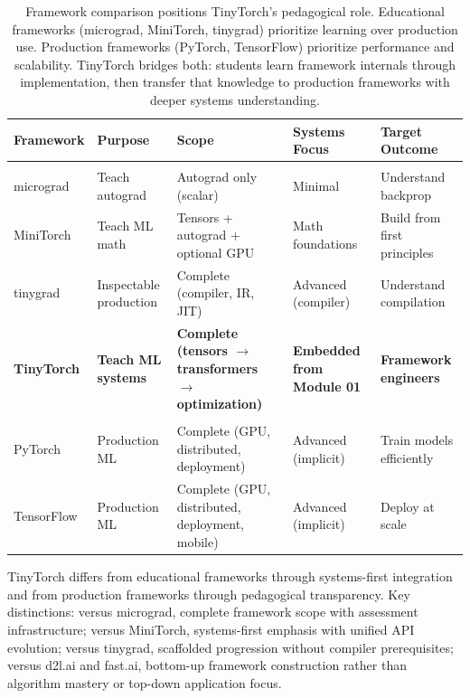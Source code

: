 \documentclass[10pt,twocolumn]{article}
\begin{document}
\begin{table}[tp]
\centering
\caption{Framework comparison positions TinyTorch's pedagogical role. Educational frameworks (micrograd, MiniTorch, tinygrad) prioritize learning over production use. Production frameworks (PyTorch, TensorFlow) prioritize performance and scalability. TinyTorch bridges both: students learn framework internals through implementation, then transfer that knowledge to production frameworks with deeper systems understanding.}
\label{tab:framework-comparison}
\small
\renewcommand{\arraystretch}{1.4}
\setlength{\tabcolsep}{6pt}
\begin{tabularx}{0.98\textwidth}{@{}>{\raggedright\arraybackslash}p{2.0cm}>{\raggedright\arraybackslash}p{2.0cm}>{\raggedright\arraybackslash}X>{\raggedright\arraybackslash}X>{\raggedright\arraybackslash}X@{}}
\toprule
\textbf{Framework} & \textbf{Purpose} & \textbf{Scope} & \textbf{Systems Focus} & \textbf{Target Outcome} \\
\midrule
\multicolumn{5}{@{}l}{\textbf{Educational Frameworks}} \\
\addlinespace[2pt]
micrograd & Teach autograd & Autograd only (scalar) & Minimal & Understand backprop \\
MiniTorch & Teach ML math & Tensors + autograd + optional GPU & Math foundations & Build from first principles \\
tinygrad & Inspectable production & Complete (compiler, IR, JIT) & Advanced (compiler) & Understand compilation \\
\addlinespace[1pt]
\textbf{TinyTorch} & \textbf{Teach ML systems} & \textbf{Complete (tensors $\rightarrow$ transformers $\rightarrow$ optimization)} & \textbf{Embedded from Module 01} & \textbf{Framework engineers} \\
\addlinespace[2pt]
\midrule
\multicolumn{5}{@{}l}{\textbf{Production Frameworks}} \\
\addlinespace[2pt]
PyTorch & Production ML & Complete (GPU, distributed, deployment) & Advanced (implicit) & Train models efficiently \\
TensorFlow & Production ML & Complete (GPU, distributed, deployment, mobile) & Advanced (implicit) & Deploy at scale \\
\bottomrule
\end{tabularx}
\end{table}

TinyTorch differs from educational frameworks through systems-first integration and from production frameworks through pedagogical transparency. Key distinctions: versus micrograd, complete framework scope with assessment infrastructure; versus MiniTorch, systems-first emphasis with unified API evolution; versus tinygrad, scaffolded progression without compiler prerequisites; versus d2l.ai and fast.ai, bottom-up framework construction rather than algorithm mastery or top-down application focus.
\end{document}
